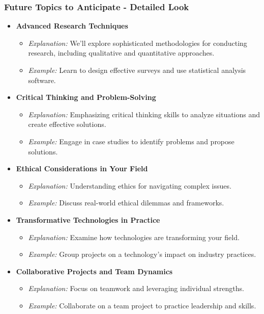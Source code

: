 \documentclass[aspectratio=169]{beamer}
\begin{document}
\begin{frame}[fragile]
    \frametitle{Future Topics to Anticipate - Detailed Look}
    \begin{itemize}
        \item \textbf{Advanced Research Techniques}
            \begin{itemize}
                \item \textit{Explanation:} We'll explore sophisticated methodologies for conducting research, including qualitative and quantitative approaches.
                \item \textit{Example:} Learn to design effective surveys and use statistical analysis software.
            \end{itemize}

        \item \textbf{Critical Thinking and Problem-Solving}
            \begin{itemize}
                \item \textit{Explanation:} Emphasizing critical thinking skills to analyze situations and create effective solutions.
                \item \textit{Example:} Engage in case studies to identify problems and propose solutions.
            \end{itemize}

        \item \textbf{Ethical Considerations in Your Field}
            \begin{itemize}
                \item \textit{Explanation:} Understanding ethics for navigating complex issues.
                \item \textit{Example:} Discuss real-world ethical dilemmas and frameworks.
            \end{itemize}

        \item \textbf{Transformative Technologies in Practice}
            \begin{itemize}
                \item \textit{Explanation:} Examine how technologies are transforming your field.
                \item \textit{Example:} Group projects on a technology's impact on industry practices.
            \end{itemize}

        \item \textbf{Collaborative Projects and Team Dynamics}
            \begin{itemize}
                \item \textit{Explanation:} Focus on teamwork and leveraging individual strengths.
                \item \textit{Example:} Collaborate on a team project to practice leadership and skills.
            \end{itemize}
    \end{itemize}
\end{frame}
\end{document}
